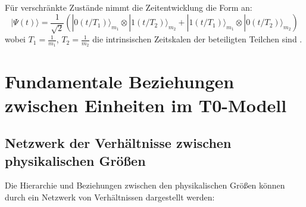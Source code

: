 \documentclass[12pt,a4paper]{article}
\begin{document}
	Für verschränkte Zustände nimmt die Zeitentwicklung die Form an:
	\begin{equation}
		|\Psi(t)\rangle = \frac{1}{\sqrt{2}}\left(|0(t/T_1)\rangle_{m_1} \otimes |1(t/T_2)\rangle_{m_2} + |1(t/T_1)\rangle_{m_1} \otimes |0(t/T_2)\rangle_{m_2}\right)
	\end{equation}
	wobei $T_1 = \frac{1}{m_1}$, $T_2 = \frac{1}{m_2}$ die intrinsischen Zeitskalen der beteiligten Teilchen sind \cite{pascher_quantum_2025, pascher_photons_2025}.
	
	\section{Fundamentale Beziehungen zwischen Einheiten im T0-Modell}
	
	\subsection{Netzwerk der Verhältnisse zwischen physikalischen Größen}
	
	Die Hierarchie und Beziehungen zwischen den physikalischen Größen können durch ein Netzwerk von Verhältnissen dargestellt werden:
	
\end{document}
